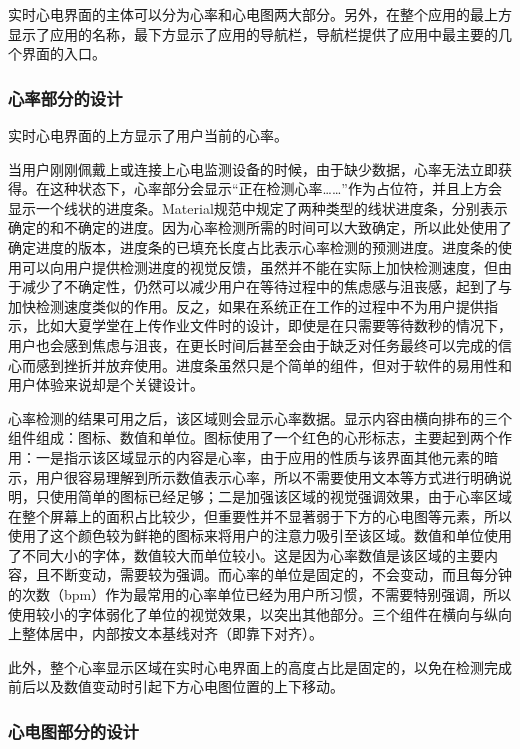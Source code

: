 实时心电界面的主体可以分为心率和心电图两大部分。另外，在整个应用的最上方显示了应用的名称，最下方显示了应用的导航栏，导航栏提供了应用中最主要的几个界面的入口。

\subsubsection{心率部分的设计}\label{subsubsec:heart-rate-design}

实时心电界面的上方显示了用户当前的心率。

当用户刚刚佩戴上或连接上心电监测设备的时候，由于缺少数据，心率无法立即获得。在这种状态下，心率部分会显示“正在检测心率……”作为占位符，并且上方会显示一个线状的进度条。Material规范中规定了两种类型的线状进度条，分别表示确定的和不确定的进度。因为心率检测所需的时间可以大致确定，所以此处使用了确定进度的版本，进度条的已填充长度占比表示心率检测的预测进度。进度条的使用可以向用户提供检测进度的视觉反馈，虽然并不能在实际上加快检测速度，但由于减少了不确定性，仍然可以减少用户在等待过程中的焦虑感与沮丧感，起到了与加快检测速度类似的作用。反之，如果在系统正在工作的过程中不为用户提供指示，比如大夏学堂在上传作业文件时的设计，即使是在只需要等待数秒的情况下，用户也会感到焦虑与沮丧，在更长时间后甚至会由于缺乏对任务最终可以完成的信心而感到挫折并放弃使用。进度条虽然只是个简单的组件，但对于软件的易用性和用户体验来说却是个关键设计。

心率检测的结果可用之后，该区域则会显示心率数据。显示内容由横向排布的三个组件组成：图标、数值和单位。图标使用了一个红色的心形标志，主要起到两个作用：一是指示该区域显示的内容是心率，由于应用的性质与该界面其他元素的暗示，用户很容易理解到所示数值表示心率，所以不需要使用文本等方式进行明确说明，只使用简单的图标已经足够；二是加强该区域的视觉强调效果，由于心率区域在整个屏幕上的面积占比较少，但重要性并不显著弱于下方的心电图等元素，所以使用了这个颜色较为鲜艳的图标来将用户的注意力吸引至该区域。数值和单位使用了不同大小的字体，数值较大而单位较小。这是因为心率数值是该区域的主要内容，且不断变动，需要较为强调。而心率的单位是固定的，不会变动，而且每分钟的次数（bpm）作为最常用的心率单位已经为用户所习惯，不需要特别强调，所以使用较小的字体弱化了单位的视觉效果，以突出其他部分。三个组件在横向与纵向上整体居中，内部按文本基线对齐（即靠下对齐）。

此外，整个心率显示区域在实时心电界面上的高度占比是固定的，以免在检测完成前后以及数值变动时引起下方心电图位置的上下移动。

\subsubsection{心电图部分的设计}\label{subsubsec:ecg-design}

